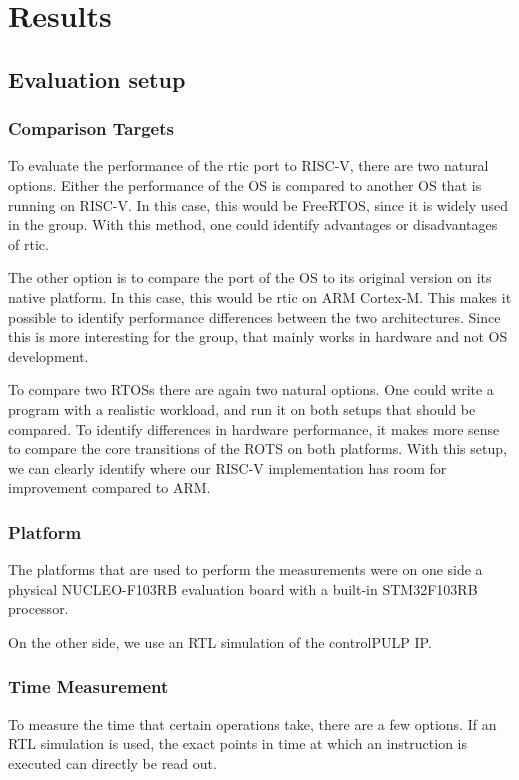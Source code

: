 \chapter{Results}
\label{ch:results}



\section{Evaluation setup}

\subsection{Comparison Targets}
\label{sec:comparison_targets}
To evaluate the performance of the \gls{rtic} port to RISC-V, there are two natural options. Either the performance of the OS is compared to another OS that is running on RISC-V. In this case, this would be FreeRTOS, since it is widely used in the group. With this method, one could identify advantages or disadvantages of \gls{rtic}.

The other option is to compare the port of the OS to its original version on its native platform. In this case, this would be \gls{rtic} on ARM Cortex-M. This makes it possible to identify performance differences between the two architectures. Since this is more interesting for the group, that mainly works in hardware and not OS development.

To compare two RTOSs there are again two natural options. One could write a program with a realistic workload, and run it on both setups that should be compared. To identify differences in hardware performance, it makes more sense to compare the core transitions of the ROTS on both platforms. With this setup, we can clearly identify where our RISC-V implementation has room for improvement compared to ARM.

\subsection{Platform}
The platforms that are used to perform the measurements were on one side a physical NUCLEO-F103RB evaluation board with a built-in STM32F103RB processor.

On the other side, we use an RTL simulation of the controlPULP IP. 

\subsection{Time Measurement}
To measure the time that certain operations take, there are a few options. If an RTL simulation is used, the exact points in time at which an instruction is executed can directly be read out.

